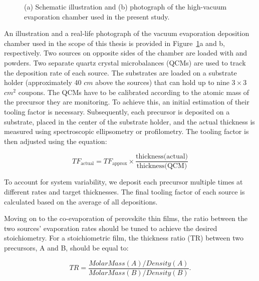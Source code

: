 \begin{figure}[htbp]
    \caption{(a) Schematic illustration and (b) photograph of the high-vacuum evaporation chamber used in the present study.}
    \label{fig:deposition_chamber}
\end{figure}



An illustration and a real-life photograph of the vacuum evaporation deposition chamber used in the scope of this thesis is provided in Figure~\ref{fig:deposition_chamber}a and b, respectively. Two sources on opposite sides of the chamber are loaded with  and  powders. Two separate quartz crystal microbalances (QCMs) are used to track the deposition rate of each source. The substrates are loaded on a substrate holder (approximately 40 $cm$ above the sources) that can hold up to nine $3\times 3$ $cm^2$ coupons. The QCMs have to be calibrated according to the atomic mass of the precursor they are monitoring. To achieve this, an initial estimation of their tooling factor is necessary. Subsequently, each precursor is deposited on a  substrate, placed in the center of the substrate holder, and the actual thickness is measured using spectroscopic ellipsometry or profilometry. The tooling factor is then adjusted using the equation: 

\begin{equation}
    TF_{\text{actual}} = TF_{\text{approx}} \times \frac{\text{thickness(actual)}}{\text{thickness(QCM)}}
\end{equation}

To account for system variability, we deposit each precursor multiple times at different rates and target thicknesses. The final tooling factor of each source is calculated based on the average of all depositions.


Moving on to the co-evaporation of perovskite thin films, the ratio between the two sources' evaporation rates should be tuned to achieve the desired stoichiometry. For a stoichiometric film, the thickness ratio (TR) between two precursors, A and B, should be equal to: 

\begin{equation}
    TR = \frac{MolarMass(A)/Density(A)}{MolarMass(B)/Density(B)}.
\end{equation}

